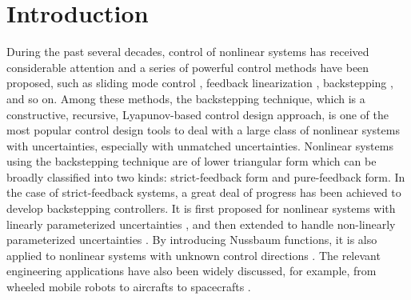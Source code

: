 \documentclass{tSYS2e}
\theoremstyle{plain}
\theoremstyle{definition}
\begin{document}
\section{Introduction}
During the past several decades, control of nonlinear systems has received considerable attention
and a series of powerful control methods have been proposed, such as sliding mode control
\citep{Slotine1991}, feedback linearization \citep{Sastry1989},
backstepping \citep{Kanellakopoulos1991}, and so on. Among these methods, the backstepping technique,
which is a constructive, recursive, Lyapunov-based control design approach,
is one of the most popular control design tools to deal with a large
class of nonlinear systems with uncertainties, especially with unmatched
uncertainties. Nonlinear systems using the backstepping technique are of
lower triangular form which can be broadly classified into two kinds:
strict-feedback form and pure-feedback form. In the case of
strict-feedback systems, a great deal of progress has been achieved to
develop backstepping controllers. It is first proposed for
nonlinear systems with linearly parameterized uncertainties \citep
{Kanellakopoulos1991, Krstic1995}, and then extended to handle
non-linearly parameterized uncertainties \citep{Lin2002a, Lin2002b, Niu2005}. By
introducing Nussbaum functions, it is also applied to
nonlinear systems with unknown control directions \citep{Ye1999}.
The relevant engineering applications
have also been widely discussed, for example, from
wheeled mobile robots \citep{Mnif2005} to aircrafts \citep{Lungu 2013} to spacecrafts \citep{Ali2010}.
\end{document}
